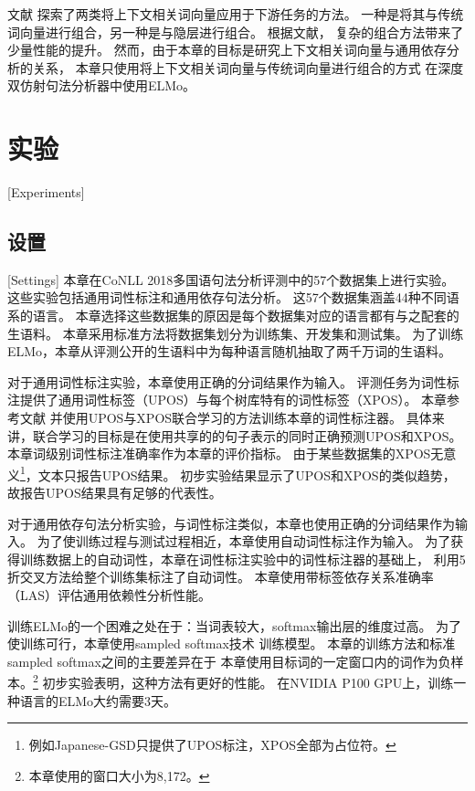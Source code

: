 文献
探索了两类将上下文相关词向量应用于下游任务的方法。
一种是将其与传统词向量进行组合，另一种是与隐层进行组合。
根据文献，
复杂的组合方法带来了少量性能的提升。
然而，由于本章的目标是研究上下文相关词向量与通用依存分析的关系，
本章只使用将上下文相关词向量与传统词向量进行组合的方式
在深度双仿射句法分析器中使用ELMo。

\section{实验}[Experiments]\label{sec:seq:exp}

\subsection{设置}[Settings]\label{sec:seq:exp:settings}
本章在CoNLL 2018多国语句法分析评测\cite{udst:overview}中的57个数据集上进行实验。
这些实验包括通用词性标注和通用依存句法分析。
这57个数据集涵盖44种不同语系的语言。
本章选择这些数据集的原因是每个数据集对应的语言都有与之配套的生语料。
本章采用标准方法将数据集划分为训练集、开发集和测试集。
为了训练ELMo，本章从评测公开的生语料中为每种语言随机抽取了两千万词的生语料。

对于通用词性标注实验，本章使用正确的分词结果作为输入。
评测任务为词性标注提供了通用词性标签（UPOS）与每个树库特有的词性标签（XPOS）。
本章参考文献
并使用UPOS与XPOS联合学习的方法训练本章的词性标注器。
具体来讲，联合学习的目标是在使用共享的的句子表示的同时正确预测UPOS和XPOS。
本章词级别词性标注准确率作为本章的评价指标。
由于某些数据集的XPOS无意义\footnote{例如Japanese-GSD只提供了UPOS标注，XPOS全部为占位符。}，文本只报告UPOS结果。
初步实验结果显示了UPOS和XPOS的类似趋势，故报告UPOS结果具有足够的代表性。

对于通用依存句法分析实验，与词性标注类似，本章也使用正确的分词结果作为输入。
为了使训练过程与测试过程相近，本章使用自动词性标注作为输入。
为了获得训练数据上的自动词性，本章在词性标注实验中的词性标注器的基础上，
利用5折交叉方法给整个训练集标注了自动词性。
本章使用带标签依存关系准确率（LAS）评估通用依赖性分析性能。

训练ELMo的一个困难之处在于：当词表较大，softmax输出层的维度过高。
为了使训练可行，本章使用sampled softmax技术\cite{jean-EtAl:2015:ACL-IJCNLP}
训练模型。
本章的训练方法和标准sampled softmax之间的主要差异在于
本章使用目标词的一定窗口内的词作为负样本。\footnote{本章使用的窗口大小为8,172。}
初步实验表明，这种方法有更好的性能。
在NVIDIA P100 GPU上，训练一种语言的ELMo大约需要3天。

